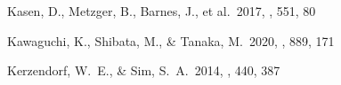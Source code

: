 \documentclass[twocolumn, twocolappendix]{aastex63}
\begin{document}
\begin{thebibliography}{}






 Kasen, D., Metzger, B., Barnes, J., et al.\ 2017, \nat, 551, 80












 Kawaguchi, K., Shibata, M., \& Tanaka, M.\ 2020, \apj, 889, 171


 Kerzendorf, W.~E., \& Sim, S.~A.\ 2014, \mnras, 440, 387













\end{thebibliography}
\end{document}
